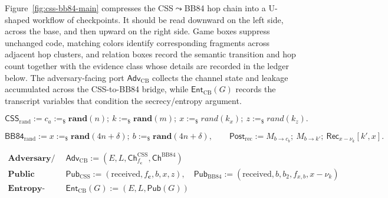 \documentclass{report}
\theoremstyle{defn_style}
\begin{document}
Figure~\ref{fig:css-bb84-main} compresses the CSS$\leadsto$BB84 hop
chain into a U-shaped workflow of checkpoints.
It should be read downward on the left side, across the base, and then
upward on the right side.
Game boxes suppress unchanged code, matching colors identify
corresponding fragments across adjacent hop clusters, and relation boxes record the
semantic transition and hop count together with the evidence class
whose details are recorded in the ledger below.
The adversary-facing port $\mathsf{Adv}_{\mathrm{CB}}$ collects the
channel state and leakage accumulated across the CSS-to-BB84 bridge,
while $\mathsf{Ent}_{\mathrm{CB}}(G)$ records the transcript variables
that condition the secrecy/entropy argument.

\[
\mathsf{CSS}_{\mathrm{rand}}
:=
c_a :=_\$ \textbf{rand}(n);\ k :=_\$ \textbf{rand}(m);\ x :=_\$ \textit{rand}(k_x);\ z :=_\$ \textit{rand}(k_z).
\]

\[
\mathsf{BB84}_{\mathrm{rand}}
:=
x :=_\$ \textbf{rand}(4n+\delta);\ b :=_\$ \textbf{rand}(4n+\delta),
\qquad
\mathsf{Post}_{\mathrm{rec}}
:=
M_{b\to c_b};\ M_{b\to k'};\ \mathsf{Rec}_{x-\nu_k}[k',x].
\]

\[
\begin{array}{ll}
\textbf{Adversary/channel port:}
& \mathsf{Adv}_{\mathrm{CB}} := (E,L,\mathsf{Ch}^{\mathrm{CSS}}_{f_{\mathbf c}},\mathsf{Ch}^{\mathrm{BB84}}) \\[1mm]
\textbf{Public ports:}
& \mathsf{Pub}_{\mathrm{CSS}} := (\mathrm{received},f_{\mathbf c},b,x,z),\quad
\mathsf{Pub}_{\mathrm{BB84}} := (\mathrm{received},b,b_2,f_{x,b},x-\nu_k) \\[1mm]
\textbf{Entropy-conditioning port:}
& \mathsf{Ent}_{\mathrm{CB}}(G) := (E,L,\mathsf{Pub}(G))
\end{array}
\]
\end{document}
